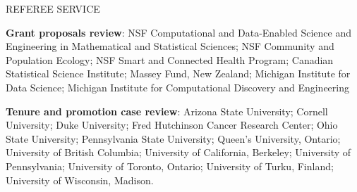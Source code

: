 \begin{mylist}{REFEREE SERVICE}
\item {\bf Grant proposals review}: 
NSF Computational and Data-Enabled Science and Engineering in Mathematical and Statistical Sciences;
NSF Community and Population Ecology;
NSF Smart and Connected Health Program;
Canadian Statistical Science Institute;
Massey Fund, New Zealand;
Michigan Institute for Data Science;
Michigan Institute for Computational Discovery and Engineering

\item {\bf Tenure and promotion case review}:
Arizona State University;
Cornell University;
Duke University;
Fred Hutchinson Cancer Research Center;
Ohio State University;
Pennsylvania State University;
Queen's University, Ontario;
University of British Columbia;
University of California, Berkeley;
University of Pennsylvania;
University of Toronto, Ontario;
University of Turku, Finland;
University of Wisconsin, Madison.

\end{mylist}


